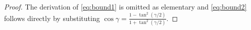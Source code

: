 \documentclass[10pt,a4paper]{amsart}
\begin{document}
\begin{proof}
The derivation of \eqref{eq:bound1} is omitted as elementary and \eqref{eq:bound2} follows directly by substituting $\cos\gamma=\frac{1-\tan^2(\gamma/2)}{1+\tan^2(\gamma/2)}$.
\end{proof}
\end{document}
